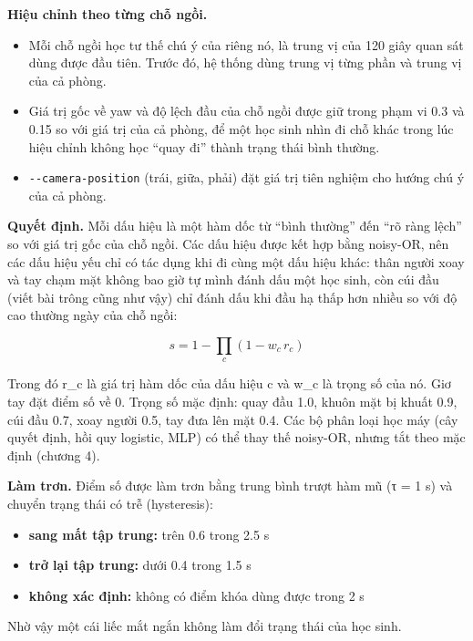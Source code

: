 \textbf{Hiệu chỉnh theo từng chỗ ngồi.}

\begin{itemize}
\tightlist
\item
  Mỗi chỗ ngồi học tư thế chú ý của riêng nó, là trung vị của 120 giây quan sát dùng được đầu tiên. Trước đó, hệ thống dùng trung vị từng phần và trung vị của cả phòng.
\item
  Giá trị gốc về yaw và độ lệch đầu của chỗ ngồi được giữ trong phạm vi 0.3 và 0.15 so với giá trị của cả phòng, để một học sinh nhìn đi chỗ khác trong lúc hiệu chỉnh không học ``quay đi'' thành trạng thái bình thường.
\item
  \texttt{-\/-camera-position} (trái, giữa, phải) đặt giá trị tiên nghiệm cho hướng chú ý của cả phòng.
\end{itemize}

\textbf{Quyết định.} Mỗi dấu hiệu là một hàm dốc từ ``bình thường'' đến ``rõ ràng lệch'' so với giá trị gốc của chỗ ngồi. Các dấu hiệu được kết hợp bằng noisy-OR, nên các dấu hiệu yếu chỉ có tác dụng khi đi cùng một dấu hiệu khác: thân người xoay và tay chạm mặt không bao giờ tự mình đánh dấu một học sinh, còn cúi đầu (viết bài trông cũng như vậy) chỉ đánh dấu khi đầu hạ thấp hơn nhiều so với độ cao thường ngày của chỗ ngồi:

\begin{equation}
s = 1 - \prod_{c} \left(1 - w_c \, r_c\right)
\end{equation}

Trong đó r\_c là giá trị hàm dốc của dấu hiệu c và w\_c là trọng số của nó. Giơ tay đặt điểm số về 0. Trọng số mặc định: quay đầu 1.0, khuôn mặt bị khuất 0.9, cúi đầu 0.7, xoay người 0.5, tay đưa lên mặt 0.4. Các bộ phân loại học máy (cây quyết định, hồi quy logistic, MLP) có thể thay thế noisy-OR, nhưng tắt theo mặc định (chương 4).

\textbf{Làm trơn.} Điểm số được làm trơn bằng trung bình trượt hàm mũ (τ = 1 s) và chuyển trạng thái có trễ (hysteresis):

\begin{itemize}
\tightlist
\item
  \textbf{sang mất tập trung:} trên 0.6 trong 2.5 s
\item
  \textbf{trở lại tập trung:} dưới 0.4 trong 1.5 s
\item
  \textbf{không xác định:} không có điểm khóa dùng được trong 2 s
\end{itemize}

Nhờ vậy một cái liếc mắt ngắn không làm đổi trạng thái của học sinh.

